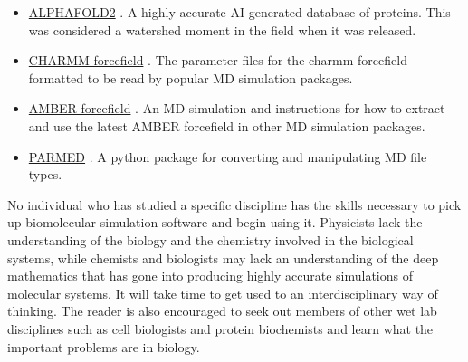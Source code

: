 \begin{itemize}
	\item \href{https://alphafold.ebi.ac.uk/}{ALPHAFOLD2} \cite{jumper2021}. A highly accurate AI generated database of proteins. This was considered a watershed moment in the field when it was released.
	\item \href{http://mackerell.umaryland.edu/charmm_ff.shtml}{CHARMM forcefield} \cite{huang2017}. The parameter files for the charmm forcefield formatted to be read by popular MD simulation packages.
	\item \href{https://ambermd.org/AmberModels.php}{AMBER forcefield} \cite{huang2017}. An MD simulation and instructions for how to extract and use the latest AMBER forcefield in other MD simulation packages.
	\item \href{https://parmed.github.io/ParmEd/html/index.html}{PARMED} \cite{shirts2017}. A python package for converting and manipulating MD file types.
\end{itemize}

No individual who has studied a specific discipline has the skills necessary to pick up biomolecular simulation software and begin using it. Physicists lack the understanding of the biology and the chemistry involved in the biological systems, while chemists and biologists may lack an understanding of the deep mathematics that has gone into producing highly accurate simulations of molecular systems. It will take time to get used to an interdisciplinary way of thinking. The reader is also encouraged to seek out members of other wet lab disciplines such as cell biologists and protein biochemists and learn what the important problems are in biology.
